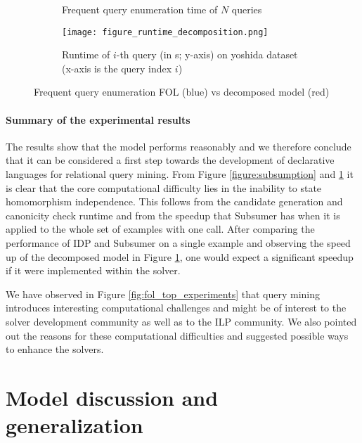 \begin{figure}[thb]
\begin{center}
\begin{subfigure}{1\textwidth}
{\begin{tabular}{l l r r r r r}
        \end{tabular}}
        \vspace{3pt}
        \caption{Frequent query enumeration time of $N$ queries}
        \label{table:query_enumeration}
      \end{subfigure}
      \hfill 
      \begin{subfigure}{1\textwidth}
        \phantom{text}
        \texttt{[image: figure\_runtime\_decomposition.png]}
        \caption{Runtime of $i$-th query (in s; y-axis) on yoshida dataset\\(x-axis is the query index $i$)}
        \label{fig:fol_enumeration_experiments}
      \end{subfigure}
    \end{center}
    \caption{Frequent query enumeration FOL (blue) vs decomposed model (red)}
  \end{figure}

\paragraph{Summary of the experimental results}
The results show that the model performs reasonably and we therefore conclude that it can be considered a first step towards the development of declarative languages for relational query mining. From Figure \ref{figure:subsumption} and \ref{table:query_enumeration} it is clear that the core computational difficulty lies in the inability to state homomorphism independence. 
This follows from the candidate generation and canonicity check runtime and from the speedup that Subsumer has when it is applied to the whole set of examples with one call. After comparing the performance of  IDP and Subsumer on a single example and observing the speed up of the decomposed model in Figure \ref{table:query_enumeration}, one would expect a significant speedup if it were implemented within the solver.

  We have observed in Figure \ref{fig:fol_top_experiments} that query mining introduces interesting computational challenges and might be of interest to the solver development community as well as to the ILP community. We also pointed out the reasons for these computational difficulties and suggested possible ways to enhance the solvers.

\section{Model discussion and generalization}
\label{sec:approach_extension}
